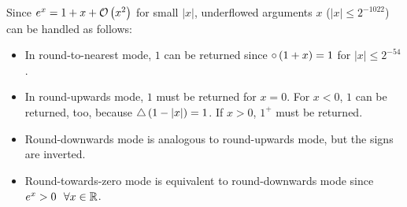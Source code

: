 Since $e^{x} = 1 + x + \mathcal{O}\left( x^2 \right)$ for small $\left
\vert x \right \vert$, underflowed arguments $x$ ($\left \vert x \right
\vert \leq 2^{-1022}$) can be handled as follows:
\begin{itemize}
\item In round-to-nearest mode, $1$ can be returned since $\circ
\left( 1 + x \right) = 1$ for $\left \vert x \right \vert \leq
2^{-54}$.
\item In round-upwards mode, $1$ must be returned for $x = 0$. For $x
< 0$, $1$ can be returned, too, because $\bigtriangleup \left( 1 - \left
\vert x \right \vert \right) = 1$.  If $x > 0$, $1^+$ must be
returned.
\item Round-downwards mode is analogous to round-upwards mode, but the signs 
are inverted. 
\item Round-towards-zero mode is equivalent to round-downwards mode since 
$e^x > 0 \mbox{~~} \forall x \in \mathbb {R}$.
\end{itemize}

